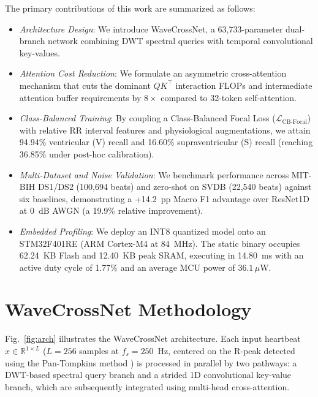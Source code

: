 \documentclass[conference]{IEEEtran}
\begin{document}
The primary contributions of this work are summarized as follows:
\begin{itemize}
    \item \emph{Architecture Design}: We introduce WaveCrossNet, a 63,733-parameter dual-branch network combining DWT spectral queries with temporal convolutional key-values.
    \item \emph{Attention Cost Reduction}: We formulate an asymmetric cross-attention mechanism that cuts the dominant $QK^\top$ interaction FLOPs and intermediate attention buffer requirements by $8\times$ compared to 32-token self-attention.
    \item \emph{Class-Balanced Training}: By coupling a Class-Balanced Focal Loss ($\mathcal{L}_{\text{CB-Focal}}$) with relative RR interval features and physiological augmentations, we attain 94.94\% ventricular (V) recall and 16.60\% supraventricular (S) recall (reaching 36.85\% under post-hoc calibration).
    \item \emph{Multi-Dataset and Noise Validation}: We benchmark performance across MIT-BIH DS1/DS2 (100,694 beats) and zero-shot on SVDB (22,540 beats) against six baselines, demonstrating a +14.2~pp Macro F1 advantage over ResNet1D at 0~dB AWGN (a 19.9\% relative improvement).
    \item \emph{Embedded Profiling}: We deploy an INT8 quantized model onto an STM32F401RE (ARM Cortex-M4 at 84~MHz). The static binary occupies 62.24~KB Flash and 12.40~KB peak SRAM, executing in 14.80~ms with an active duty cycle of 1.77\% and an average MCU power of $36.1\,\mu\text{W}$.
\end{itemize}

\section{WaveCrossNet Methodology}
\label{sec:arch}

Fig.~\ref{fig:arch} illustrates the WaveCrossNet architecture. Each input heartbeat $x \in \mathbb{R}^{1 \times L}$ ($L=256$ samples at $f_s = 250$~Hz, centered on the R-peak detected using the Pan-Tompkins method \cite{pan1985real}) is processed in parallel by two pathways: a DWT-based spectral query branch and a strided 1D convolutional key-value branch, which are subsequently integrated using multi-head cross-attention.
\end{document}

